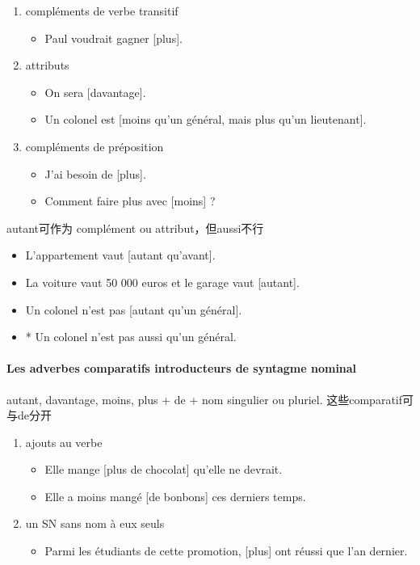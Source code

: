 \documentclass[UTF8]{report}
\begin{document}
\begin{enumerate}
    \item compléments de verbe transitif
    \begin{itemize}
        \item Paul voudrait gagner [plus].
    \end{itemize}
    \item attributs
    \begin{itemize}
        \item On sera [davantage].
        \item Un colonel est [moins qu’un général, mais plus qu’un lieutenant].
    \end{itemize}
    \item compléments de préposition
    \begin{itemize}
        \item J’ai besoin de [plus].
        \item Comment faire plus avec [moins] ?
    \end{itemize}
\end{enumerate}

autant可作为 complément ou attribut，但aussi不行
\begin{itemize}
    \item L’appartement vaut [autant qu’avant].
    \item La voiture vaut 50 000 euros et le garage vaut [autant].
    \item Un colonel n’est pas [autant qu’un général].
    \item * Un colonel n’est pas aussi qu’un général.
\end{itemize}


\paragraph{Les adverbes comparatifs introducteurs de syntagme nominal}
autant, davantage, moins, plus + de + nom singulier ou pluriel. 这些comparatif可与de分开
\begin{enumerate}
    \item ajouts au verbe
    \begin{itemize}
        \item Elle mange [plus de chocolat] qu’elle ne devrait.
        \item Elle a moins mangé [de bonbons] ces derniers temps.
    \end{itemize}
    \item un SN sans nom à eux seuls
    \begin{itemize}
        \item Parmi les étudiants de cette promotion, [plus] ont réussi que l’an dernier.
    \end{itemize}
\end{enumerate}
\end{document}
